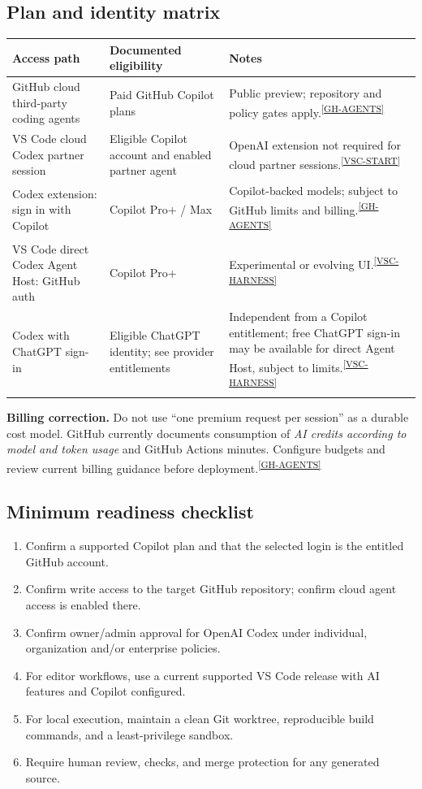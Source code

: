 \documentclass[11pt,letterpaper,oneside]{article}
\newcommand{\src}[1]{\textsuperscript{\hyperref[ref:#1]{[#1]}}}
\begin{document}
\subsection{Plan and identity matrix}
\begin{table}[htbp]
\small
\centering
\begin{tabularx}{\linewidth}{@{}>{\raggedright\arraybackslash}p{3.0cm}>{\raggedright\arraybackslash}p{3.5cm}Y@{}}
\toprule
\textbf{Access path} & \textbf{Documented eligibility} & \textbf{Notes}\tabularnewline\midrule
GitHub cloud third-party coding agents & Paid GitHub Copilot plans & Public preview; repository and policy gates apply.\src{GH-AGENTS}\\
VS Code cloud Codex partner session & Eligible Copilot account and enabled partner agent & OpenAI extension not required for cloud partner sessions.\src{VSC-START}\\
Codex extension: sign in with Copilot & Copilot Pro+ / Max & Copilot-backed models; subject to GitHub limits and billing.\src{GH-AGENTS}\\
VS Code direct Codex Agent Host: GitHub auth & Copilot Pro+ & Experimental or evolving UI.\src{VSC-HARNESS}\\
Codex with ChatGPT sign-in & Eligible ChatGPT identity; see provider entitlements & Independent from a Copilot entitlement; free ChatGPT sign-in may be available for direct Agent Host, subject to limits.\src{VSC-HARNESS}\\
\bottomrule
\end{tabularx}
\end{table}

\begin{riskbox}
\textbf{Billing correction.} Do not use ``one premium request per session'' as a durable cost model. GitHub currently documents consumption of \emph{AI credits according to model and token usage} and GitHub Actions minutes. Configure budgets and review current billing guidance before deployment.\src{GH-AGENTS}
\end{riskbox}

\subsection{Minimum readiness checklist}
\begin{enumerate}
\item Confirm a supported Copilot plan and that the selected login is the entitled GitHub account.
\item Confirm write access to the target GitHub repository; confirm cloud agent access is enabled there.
\item Confirm owner/admin approval for OpenAI Codex under individual, organization and/or enterprise policies.
\item For editor workflows, use a current supported VS Code release with AI features and Copilot configured.
\item For local execution, maintain a clean Git worktree, reproducible build commands, and a least-privilege sandbox.
\item Require human review, checks, and merge protection for any generated source.
\end{enumerate}
\end{document}
